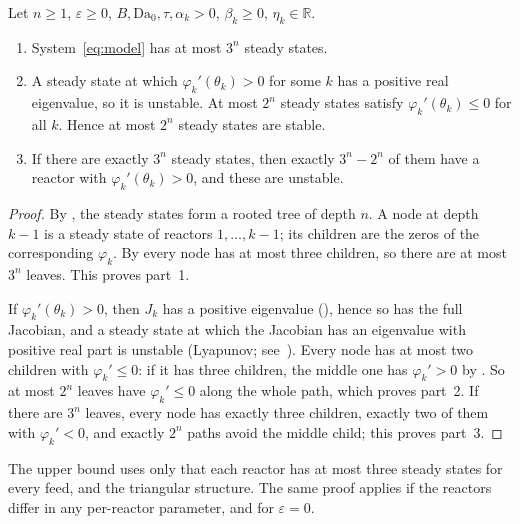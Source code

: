 \documentclass[11pt,a4paper]{report}
\newcommand*{\Da}{\mathrm{Da}_0}
\newcommand*{\eps}{\varepsilon}
\begin{document}
\begin{theorem}[note={upper bounds}]\label{thm:upper}
Let \(n\ge1\), \(\eps\ge0\), \(B,\Da,\tau,\alpha_k>0\), \(\beta_k\ge0\), \(\eta_k\in\mathbb R\).
\begin{enumerate}
\item System~\eqref{eq:model} has at most \(3^n\) steady states.
\item A steady state at which \(\varphi_k'(\theta_k)>0\) for some \(k\) has a positive real eigenvalue, so it is
unstable. At most \(2^n\) steady states satisfy \(\varphi_k'(\theta_k)\le0\) for all \(k\). Hence at most \(2^n\) steady
states are stable.
\item If there are exactly \(3^n\) steady states, then exactly \(3^n-2^n\) of them have a reactor with
\(\varphi_k'(\theta_k)>0\), and these are unstable.
\end{enumerate}
\end{theorem}
\begin{proof}
By , the steady states form a rooted tree of depth \(n\). A node at depth \(k-1\) is a steady
state of reactors \(1,\dots,k-1\); its children are the zeros of the corresponding \(\varphi_k\). By
 every node has at most three children, so there are at most \(3^n\) leaves. This proves part~1.

If \(\varphi_k'(\theta_k)>0\), then \(J_k\) has a positive eigenvalue (), hence so has the full
Jacobian, and a steady state at which the Jacobian has an eigenvalue with positive real part is unstable (Lyapunov;
see~\autocite[§2.9]{Perko2001}). Every node has at most two children with \(\varphi_k'\le0\): if it has three
children, the middle one has \(\varphi_k'>0\) by . So at most \(2^n\) leaves have
\(\varphi_k'\le0\) along the whole path, which proves part~2. If there are \(3^n\) leaves, every node has exactly three
children, exactly two of them with \(\varphi_k'<0\), and exactly \(2^n\) paths avoid the middle child; this proves
part~3.
\end{proof}

\begin{remark}
The upper bound uses only that each reactor has at most three steady states for every feed, and the triangular
structure. The same proof applies if the reactors differ in any per-reactor parameter, and for \(\eps=0\).
\end{remark}
\end{document}
